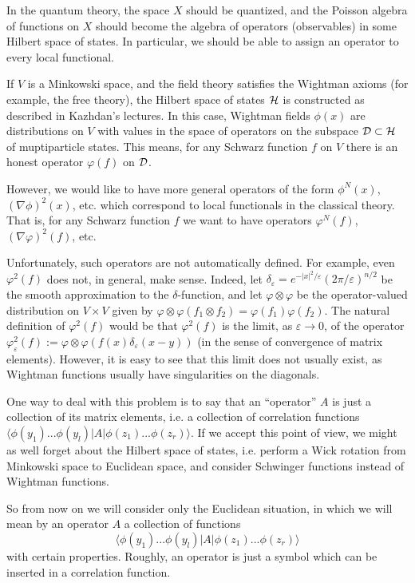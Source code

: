 \documentclass[11pt]{article}
\def\<{\langle}
\def\>{\rangle}
\def\o{\otimes}
\def\e{\varepsilon}
\begin{document}
In the quantum theory, the space $X$ should be quantized, and
the Poisson algebra of functions on $X$ should become the algebra of
operators (observables) in some Hilbert space of states. 
In particular, we should be able to assign 
an operator to every local functional. 

If $V$ is a Minkowski space, and the field theory satisfies 
the Wightman axioms (for example, the free theory), 
the Hilbert space of states ${\cal H}$ is constructed as described
in Kazhdan's lectures. In this case, Wightman fields $\phi(x)$ are
distributions on $V$ with values in the space of operators 
on the subspace ${\cal D}\subset {\cal H}$
of muptiparticle states. 
This means, for any Schwarz function $f$ on $V$ 
there is an honest operator $\varphi(f)$ on ${\cal D}$. 

However, we would like to have more general operators of the form 
$\phi^N(x)$, $(\nabla\phi)^2(x)$, etc. which correspond 
to local functionals in the classical theory. That is, for any 
Schwarz function $f$ we want to have operators $\varphi^N(f)$, 
$(\nabla\varphi)^2(f)$, etc. 

Unfortunately, such operators are not automatically defined. 
For example, even $\varphi^2(f)$ does not, in general, 
make sense. Indeed, let $\delta_\e=e^{-|x|^2/\e}(2\pi/\e)^{n/2}$
be the smooth approximation to the $\delta$-function, and
let $\varphi\o\varphi$ be the operator-valued distribution on 
$V\times V$ given by $\varphi\o\varphi(f_1\o f_2)=
\varphi(f_1)\varphi(f_2)$. 
The natural definition of $\varphi^2(f)$ would be that $\varphi^2(f)$
is the limit, as $\e\to 0$, of 
the operator $\varphi_\e^2(f):=\varphi\o\varphi(f(x)\delta_\e(x-y))$ 
(in the sense of convergence of matrix elements). 
However, it is easy to see that this limit does not usually exist, as 
Wightman functions usually have singularities on the diagonals. 

One way to deal with this problem is to say that an ``operator''
$A$ is just a collection of its matrix elements, i.e. a collection
of correlation functions $\<\phi(y_1)...\phi(y_l)|A|\phi(z_1)...\phi(z_r)\>$. 
If we accept this point of view, we might as well forget about the Hilbert
space of states, i.e. perform a Wick rotation from Minkowski space to Euclidean
space, and consider Schwinger functions instead of Wightman functions. 

So from now on we will consider only the Euclidean situation, in which 
we will mean by an operator $A$ a collection of
functions \[ \<\phi(y_1)...\phi(y_l)|A|\phi(z_1)...\phi(z_r)\>\]
with certain properties. Roughly, an operator is just a symbol which can be
inserted in a correlation function. 
\end{document}

